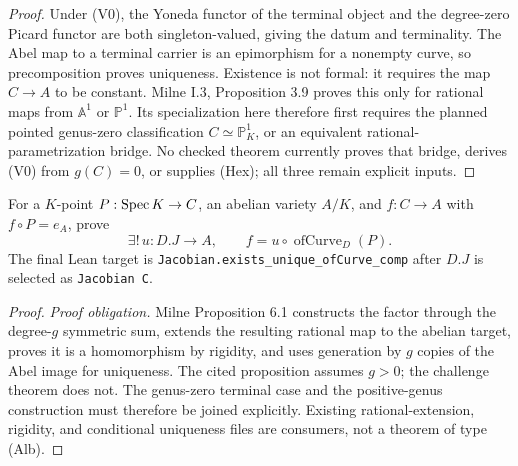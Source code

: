 \begin{proof}
  Under (V0), the Yoneda functor of the terminal object and the degree-zero
  Picard functor are both singleton-valued, giving the datum and terminality.
  The Abel map to a terminal carrier is an epimorphism for a nonempty curve, so
  precomposition proves uniqueness.  Existence is not formal: it requires the
  map \(C\to A\) to be constant.  Milne I.3, Proposition 3.9 proves this only
  for rational maps from \(\mathbb A^1\) or \(\mathbb P^1\).  Its
  specialization here therefore first requires the planned pointed
  genus-zero classification \(C\simeq\mathbb P^1_K\), or an equivalent
  rational-parametrization bridge.  No checked theorem currently proves that
  bridge, derives (V0) from \(g(C)=0\), or supplies (Hex); all three remain
  explicit inputs.
\end{proof}

\begin{theorem}
  \label{route-thm-phase8-albanese}
  \notready

  For a \(K\)-point \(P:\operatorname{Spec} K\to C\), an abelian variety \(A/K\), and
  \(f:C\to A\) with \(f\circ P=e_A\), prove
  \[
    \exists!\,u:D.J\to A,
       \qquad f=u\circ\operatorname{ofCurve}_D(P).
    \tag{Alb}
  \]
  The final Lean target is
  \texttt{Jacobian.exists\_unique\_ofCurve\_comp} after \(D.J\) is selected as
  \texttt{Jacobian C}.
\end{theorem}

\begin{proof}
  \emph{Proof obligation.}  Milne Proposition 6.1 constructs
  the factor through the degree-\(g\) symmetric sum, extends the resulting
  rational map to the abelian target, proves it is a homomorphism by rigidity,
  and uses generation by \(g\) copies of the Abel image for uniqueness.  The
  cited proposition assumes \(g>0\); the challenge theorem does not.  The
  genus-zero terminal case and the positive-genus construction must therefore
  be joined explicitly.  Existing rational-extension, rigidity, and
  conditional uniqueness files are consumers, not a theorem of type (Alb).
\end{proof}

